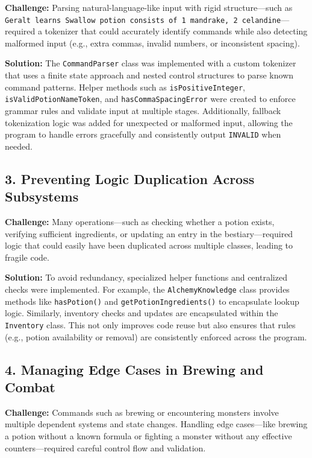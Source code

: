 \documentclass{article}
\begin{document}
\textbf{Challenge:}  
Parsing natural-language-like input with rigid structure—such as \texttt{Geralt learns Swallow potion consists of 1 mandrake, 2 celandine}—required a tokenizer that could accurately identify commands while also detecting malformed input (e.g., extra commas, invalid numbers, or inconsistent spacing).

\textbf{Solution:}  
The \texttt{CommandParser} class was implemented with a custom tokenizer that uses a finite state approach and nested control structures to parse known command patterns. Helper methods such as \texttt{isPositiveInteger}, \texttt{isValidPotionNameToken}, and \texttt{hasCommaSpacingError} were created to enforce grammar rules and validate input at multiple stages. Additionally, fallback tokenization logic was added for unexpected or malformed input, allowing the program to handle errors gracefully and consistently output \texttt{INVALID} when needed.

\subsection*{3. Preventing Logic Duplication Across Subsystems}

\textbf{Challenge:}  
Many operations—such as checking whether a potion exists, verifying sufficient ingredients, or updating an entry in the bestiary—required logic that could easily have been duplicated across multiple classes, leading to fragile code.

\textbf{Solution:}  
To avoid redundancy, specialized helper functions and centralized checks were implemented. For example, the \texttt{AlchemyKnowledge} class provides methods like \texttt{hasPotion()} and \texttt{getPotionIngredients()} to encapsulate lookup logic. Similarly, inventory checks and updates are encapsulated within the \texttt{Inventory} class. This not only improves code reuse but also ensures that rules (e.g., potion availability or removal) are consistently enforced across the program.

\subsection*{4. Managing Edge Cases in Brewing and Combat}

\textbf{Challenge:}  
Commands such as brewing or encountering monsters involve multiple dependent systems and state changes. Handling edge cases—like brewing a potion without a known formula or fighting a monster without any effective counters—required careful control flow and validation.
\end{document}
